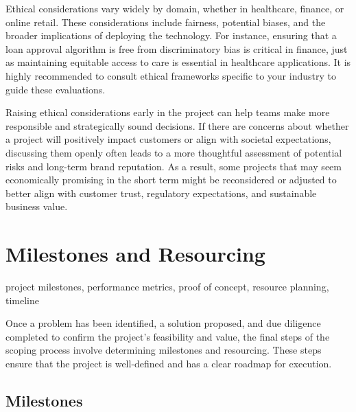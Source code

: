 \documentclass[12pt,openany]{book}
\begin{document}
Ethical considerations vary widely by domain, whether in healthcare, finance, or online retail. These considerations include fairness, potential biases, and the broader implications of deploying the technology. For instance, ensuring that a loan approval algorithm is free from discriminatory bias is critical in finance, just as maintaining equitable access to care is essential in healthcare applications. It is highly recommended to consult ethical frameworks specific to your industry to guide these evaluations. \newline

Raising ethical considerations early in the project can help teams make more responsible and strategically sound decisions. If there are concerns about whether a project will positively impact customers or align with societal expectations, discussing them openly often leads to a more thoughtful assessment of potential risks and long-term brand reputation. As a result, some projects that may seem economically promising in the short term might be reconsidered or adjusted to better align with customer trust, regulatory expectations, and sustainable business value. \newline



\section{Milestones and Resourcing}

\begin{keywordsbox}
project milestones, performance metrics, proof of concept, resource planning, timeline
\end{keywordsbox}


Once a problem has been identified, a solution proposed, and due diligence completed to confirm the project's feasibility and value, the final steps of the scoping process involve determining milestones and resourcing. These steps ensure that the project is well-defined and has a clear roadmap for execution.

\subsection{Milestones}
\end{document}
